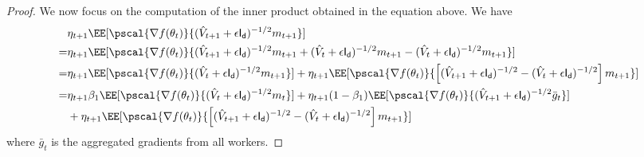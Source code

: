 \documentclass[11pt]{article}
\begin{document}
\begin{proof}
We now focus on the computation of the inner product obtained in the equation above.
We have
\begin{align}
& \eta_{t+1}\EE[ \pscal{\nabla f(\theta_t)}{(\hat{V}_{t+1} + \epsilon \mathsf{I_d})^{-1/2} m_{t+1}}]  \label{innerprod}\\
  = &\eta_{t+1} \EE[\pscal{\nabla f(\theta_t)}{(\hat{V}_{t+1} + \epsilon \mathsf{I_d})^{-1/2} m_{t+1} + (\hat{V}_{t} + \epsilon \mathsf{I_d})^{-1/2} m_{t+1} - (\hat{V}_{t} + \epsilon \mathsf{I_d})^{-1/2} m_{t+1}} ]\notag\\
    = & \eta_{t+1}\EE[ \pscal{\nabla f(\theta_t)}{(\hat{V}_{t} + \epsilon \mathsf{I_d})^{-1/2} m_{t+1}} ] +  \eta_{t+1} \EE[\pscal{\nabla f(\theta_t)}{\left[(\hat{V}_{t+1} + \epsilon \mathsf{I_d})^{-1/2} - (\hat{V}_{t} + \epsilon \mathsf{I_d})^{-1/2}  \right]m_{t+1}}]\notag\\
 = & \eta_{t+1}\beta_1\EE[ \pscal{\nabla f(\theta_t)}{(\hat{V}_{t} + \epsilon \mathsf{I_d})^{-1/2} m_{t}}] +  \eta_{t+1} (1-\beta_1) \EE[\pscal{\nabla f(\theta_t)}{(\hat{V}_{t+1} + \epsilon \mathsf{I_d})^{-1/2} \bar{g}_t}] \notag\\
&+  \eta_{t+1} \EE[\pscal{\nabla f(\theta_t)}{\left[(\hat{V}_{t+1} + \epsilon \mathsf{I_d})^{-1/2} - (\hat{V}_{t} + \epsilon \mathsf{I_d})^{-1/2}  \right]m_{t+1}}] \label{decomp}
\end{align}
where $\bar{g}_t$ is the aggregated gradients from all workers.


\end{proof}
\end{document}
